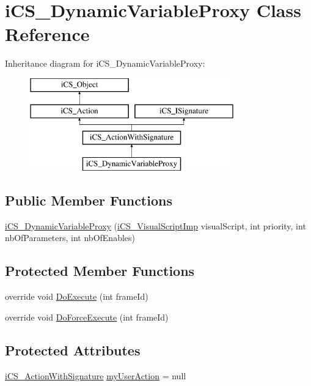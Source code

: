 \hypertarget{classi_c_s___dynamic_variable_proxy}{\section{i\+C\+S\+\_\+\+Dynamic\+Variable\+Proxy Class Reference}
\label{classi_c_s___dynamic_variable_proxy}
}
Inheritance diagram for i\+C\+S\+\_\+\+Dynamic\+Variable\+Proxy\+:\begin{figure}[H]
\begin{center}
\leavevmode
\includegraphics[height=4.000000cm]{classi_c_s___dynamic_variable_proxy}
\end{center}
\end{figure}
\subsection*{Public Member Functions}
\begin{DoxyCompactItemize}
\item 
\hyperlink{classi_c_s___dynamic_variable_proxy_a8c2542e40725832657e185917ea88e0b}{i\+C\+S\+\_\+\+Dynamic\+Variable\+Proxy} (\hyperlink{classi_c_s___visual_script_imp}{i\+C\+S\+\_\+\+Visual\+Script\+Imp} visual\+Script, int priority, int nb\+Of\+Parameters, int nb\+Of\+Enables)
\end{DoxyCompactItemize}
\subsection*{Protected Member Functions}
\begin{DoxyCompactItemize}
\item 
override void \hyperlink{classi_c_s___dynamic_variable_proxy_a8a8129b97c4e41c45cefb36d3e4afa18}{Do\+Execute} (int frame\+Id)
\item 
override void \hyperlink{classi_c_s___dynamic_variable_proxy_a3bf05f7403c4b4d2b109b8252c49c6e1}{Do\+Force\+Execute} (int frame\+Id)
\end{DoxyCompactItemize}
\subsection*{Protected Attributes}
\begin{DoxyCompactItemize}
\item 
\hyperlink{classi_c_s___action_with_signature}{i\+C\+S\+\_\+\+Action\+With\+Signature} \hyperlink{classi_c_s___dynamic_variable_proxy_ac4a6206c4de58db2fa18ce80b428c901}{my\+User\+Action} = null
\end{DoxyCompactItemize}
